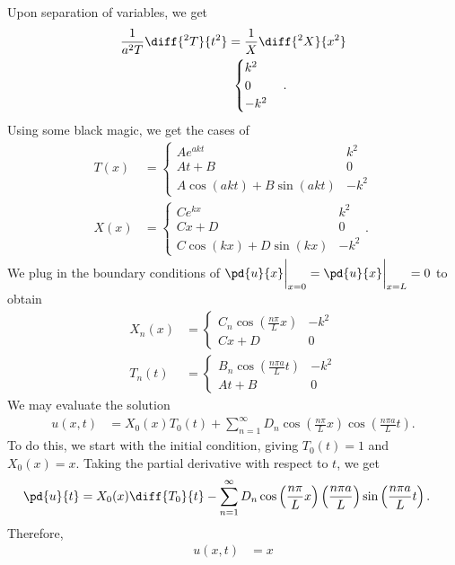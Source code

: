 \documentclass[10pt]{mypackage}
\begin{document}
\begin{solution}[12.4, Problem 8]
  Upon separation of variables, we get
  \begin{align*}
    \frac{1}{a^2 T}\diff{^2T}{t^2} &= \frac{1}{X}\diff{^2X}{x^2}\\
                               &\ \begin{cases}
                                 k^2\\
                                 0\\
                                 -k^2
                               \end{cases}.
  \end{align*}
  Using some black magic, we get the cases of
  \begin{align*}
    T(x) &= \begin{cases}
      Ae^{akt} & k^2\\
      At + B & 0\\
      A\cos\left( akt \right) + B\sin\left( akt \right) & -k^2
    \end{cases}\\
    X(x) &= \begin{cases}
      Ce^{kx} & k^2\\
      Cx + D & 0\\
      C\cos\left( kx \right) + D\sin\left( kx \right) & -k^2
    \end{cases}.
  \end{align*}
  We plug in the boundary conditions of $\pd{u}{x}\biggr\vert_{x=0} = \pd{u}{x}\biggr\vert_{x=L} = 0$ to obtain
  \begin{align*}
    X_n\left( x \right) &= \begin{cases}
      C_n\cos\left( \frac{n\pi}{L}x \right) & -k^2\\
      Cx + D & 0
    \end{cases}\\
      T_n(t) &= \begin{cases}
        B_n\cos\left( \frac{n\pi a}{L}t \right) & -k^2\\
        At + B & 0
      \end{cases}
  \end{align*}
  We may evaluate the solution
  \begin{align*}
    u\left( x,t \right) &= X_0(x)T_0(t) + \sum_{n=1}^{\infty}D_n\cos\left( \frac{n\pi}{L} x \right) \cos\left( \frac{n\pi a}{L}t \right).
  \end{align*}
  To do this, we start with the initial condition, giving $T_0(t) = 1$ and $X_0(x) = x$. Taking the partial derivative with respect to $t$, we get
  \begin{align*}
    \pd{u}{t} &= X_0(x)\diff{T_0}{t} - \sum_{n=1}^{\infty}D_n\cos\left( \frac{n\pi}{L}x \right)\left( \frac{n\pi a}{L} \right)\sin\left( \frac{n\pi a}{L}t \right).
  \end{align*}
  Therefore,
  \begin{align*}
    u\left( x,t \right) &= x
  \end{align*}
\end{solution}
\end{document}
